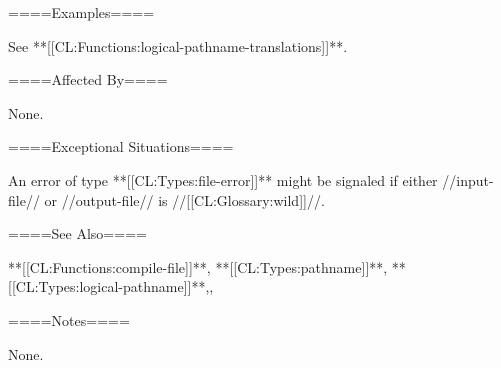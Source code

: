 ====Examples====

See **[[CL:Functions:logical-pathname-translations]]**.

====Affected By====

None.

====Exceptional Situations====

An error of type **[[CL:Types:file-error]]** might be signaled if either //input-file// or //output-file// is //[[CL:Glossary:wild]]//.

====See Also====

**[[CL:Functions:compile-file]]**, **[[CL:Types:pathname]]**, **[[CL:Types:logical-pathname]]**,{\secref\FileSystemConcepts},

{\secref\PathnamesAsFilenames}

====Notes====

None.

         
